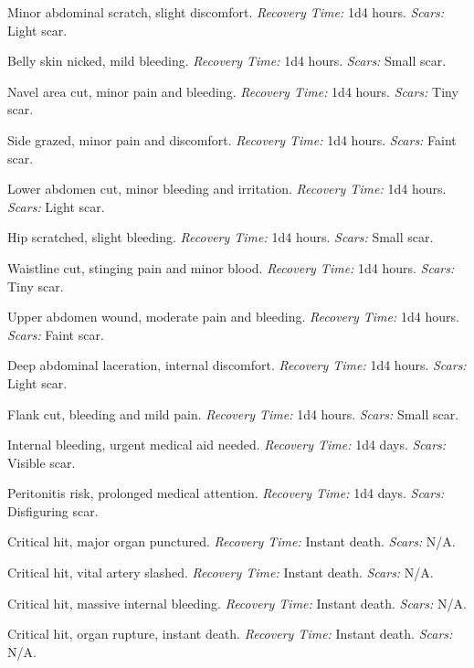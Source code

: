 \begin{description}[labelwidth=1.5em, leftmargin=*, itemsep=0.4em]
    \item[1 -] Minor abdominal scratch, slight discomfort. \textit{Recovery Time:} 1d4 hours. \textit{Scars:} Light scar.
    \item[2 -] Belly skin nicked, mild bleeding. \textit{Recovery Time:} 1d4 hours. \textit{Scars:} Small scar.
    \item[3 -] Navel area cut, minor pain and bleeding. \textit{Recovery Time:} 1d4 hours. \textit{Scars:} Tiny scar.
    \item[4 -] Side grazed, minor pain and discomfort. \textit{Recovery Time:} 1d4 hours. \textit{Scars:} Faint scar.
    \item[5 -] Lower abdomen cut, minor bleeding and irritation. \textit{Recovery Time:} 1d4 hours. \textit{Scars:} Light scar.
    \item[6 -] Hip scratched, slight bleeding. \textit{Recovery Time:} 1d4 hours. \textit{Scars:} Small scar.
    \item[7 -] Waistline cut, stinging pain and minor blood. \textit{Recovery Time:} 1d4 hours. \textit{Scars:} Tiny scar.
    \item[8 -] Upper abdomen wound, moderate pain and bleeding. \textit{Recovery Time:} 1d4 hours. \textit{Scars:} Faint scar.
    \item[9 -] Deep abdominal laceration, internal discomfort. \textit{Recovery Time:} 1d4 hours. \textit{Scars:} Light scar.
    \item[10 -] Flank cut, bleeding and mild pain. \textit{Recovery Time:} 1d4 hours. \textit{Scars:} Small scar.
    \item[11 -] Internal bleeding, urgent medical aid needed. \textit{Recovery Time:} 1d4 days. \textit{Scars:} Visible scar.
    \item[12 -] Peritonitis risk, prolonged medical attention. \textit{Recovery Time:} 1d4 days. \textit{Scars:} Disfiguring scar.
    \item[13 -] Critical hit, major organ punctured. \textit{Recovery Time:} Instant death. \textit{Scars:} N/A.
    \item[14 -] Critical hit, vital artery slashed. \textit{Recovery Time:} Instant death. \textit{Scars:} N/A.
    \item[15 -] Critical hit, massive internal bleeding. \textit{Recovery Time:} Instant death. \textit{Scars:} N/A.
    \item[16 -] Critical hit, organ rupture, instant death. \textit{Recovery Time:} Instant death. \textit{Scars:} N/A.

\end{description}
